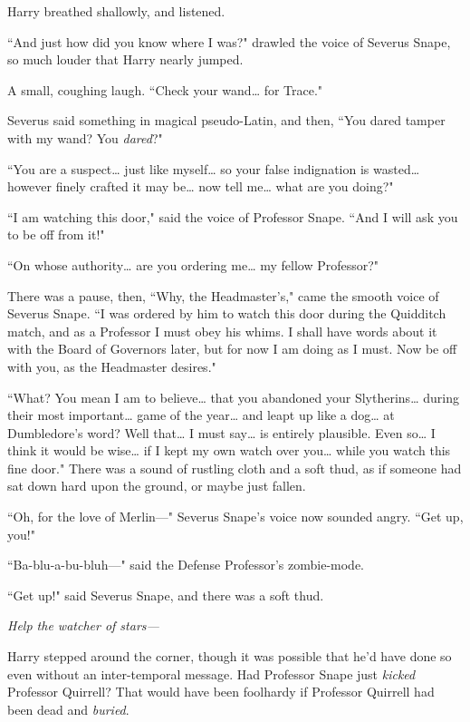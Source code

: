 Harry breathed shallowly, and listened.

``And just how did you know where I was?" drawled the voice of Severus Snape, so much louder that Harry nearly jumped.

A small, coughing laugh. ``Check your wand{\ldots} for Trace."

Severus said something in magical pseudo-Latin, and then, ``You dared tamper with my wand? You \emph{dared}?"

``You are a suspect{\ldots} just like myself{\ldots} so your false indignation is wasted{\ldots} however finely crafted it may be{\ldots} now tell me{\ldots} what are you doing?"

``I am watching this door," said the voice of Professor Snape. ``And I will ask you to be off from it!"

``On whose authority{\ldots} are you ordering me{\ldots} my fellow Professor?"

There was a pause, then, ``Why, the Headmaster's," came the smooth voice of Severus Snape. ``I was ordered by him to watch this door during the Quidditch match, and as a Professor I must obey his whims. I shall have words about it with the Board of Governors later, but for now I am doing as I must. Now be off with you, as the Headmaster desires."

``What? You mean I am to believe{\ldots} that you abandoned your Slytherins{\ldots} during their most important{\ldots} game of the year{\ldots} and leapt up like a dog{\ldots} at Dumbledore's word? Well that{\ldots} I must say{\ldots} is entirely plausible. Even so{\ldots} I think it would be wise{\ldots} if I kept my own watch over you{\ldots} while you watch this fine door." There was a sound of rustling cloth and a soft thud, as if someone had sat down hard upon the ground, or maybe just fallen.

``Oh, for the love of Merlin—" Severus Snape's voice now sounded angry. ``Get up, you!"

``Ba-blu-a-bu-bluh—" said the Defense Professor's zombie-mode.

``Get up!" said Severus Snape, and there was a soft thud.

\emph{Help the watcher of stars—}

Harry stepped around the corner, though it was possible that he'd have done so even without an inter-temporal message. Had Professor Snape just \emph{kicked} Professor Quirrell? That would have been foolhardy if Professor Quirrell had been dead and \emph{buried}.

